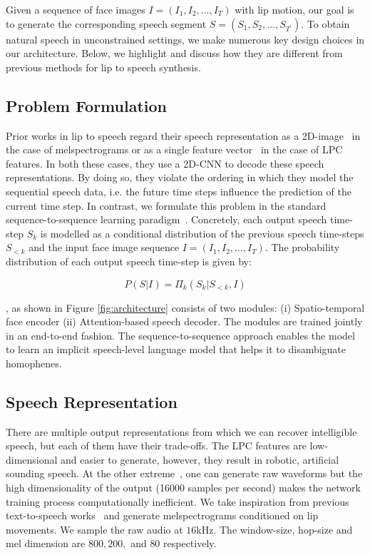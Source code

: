 \documentclass[10pt,twocolumn,letterpaper]{article}
\begin{document}
Given a sequence of face images $I = (I_1, I_2, \dots, I_T)$ with lip motion, our goal is to generate the corresponding speech segment $S = (S_1, S_2, \dots, S_{T^{'}})$. To obtain natural speech in unconstrained settings, we make numerous key design choices in our \modelname architecture. Below, we highlight and discuss how they are different from previous methods for lip to speech synthesis.

\subsection{Problem Formulation}
Prior works in lip to speech regard their speech representation as a 2D-image~\cite{ephrat2017vid2speech,vougioukas2019video} in the case of melspectrograms or as a single feature vector~\cite{ephrat2017vid2speech} in the case of LPC features. In both these cases, they use a 2D-CNN to decode these speech representations. By doing so, they violate the ordering in which they model the sequential speech data, i.e. the future time steps influence the prediction of the current time step. In contrast, we formulate this problem in the standard sequence-to-sequence learning paradigm~\cite{sutskever2014sequence}. Concretely, each output speech time-step $S_k$ is modelled as a conditional distribution of the previous speech time-steps $S_{< k}$ and the input face image sequence $I = (I_1, I_2, \dots, I_T)$. The probability distribution of each output speech time-step is given by:

\begin{equation}
{P(S | I) = \Pi_{k} (S_k | S_{< k}, I)}
\end{equation}

\modelnamewithoutspace, as shown in Figure \ref{fig:architecture} consists of two modules: (i) Spatio-temporal face encoder (ii) Attention-based speech decoder. The modules are trained jointly in an end-to-end fashion. The sequence-to-sequence approach enables the model to learn an implicit speech-level language model that helps it to disambiguate homophenes. 

\subsection{Speech Representation} There are multiple output representations from which we can recover intelligible speech, but each of them have their trade-offs. The LPC features are low-dimensional and easier to generate, however, they result in robotic, artificial sounding speech. At the other extreme~\cite{vougioukas2019video}, one can generate raw waveforms but the high dimensionality of the output (16000 samples per second) makes the network training process computationally inefficient. We take inspiration from previous text-to-speech works~\cite{ping2017deep,shen2018natural} and generate melspectrograms conditioned on lip movements. We sample the raw audio at $16$kHz. The window-size, hop-size and mel dimension are $800, 200,$ and $80$ respectively.
\end{document}
